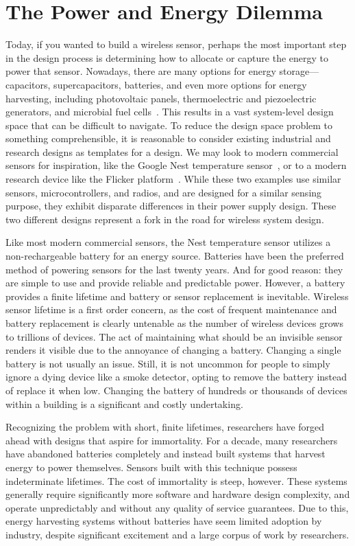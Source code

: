 \section{The Power and Energy Dilemma}
Today, if you wanted to build a wireless sensor, perhaps the most important step in the design process is determining how to allocate or capture the energy to power that sensor. 
Nowadays, there are many options for energy storage--- capacitors, supercapacitors, batteries, and even more options for energy harvesting, including photovoltaic panels, thermoelectric and piezoelectric generators, and microbial fuel cells~\cite{yervaGrafting12,campbellThermes14,campbell2018energy,josephson2020farming}.
This results in a vast system-level design space that can be difficult to navigate.
To reduce the design space problem to something comprehensible, it is reasonable to consider existing industrial and research designs as templates for a design.
We may look to modern commercial sensors for inspiration, like the Google Nest temperature sensor~\cite{googleNestTemperature}, or to a modern research device like the Flicker platform~\cite{hesterFlicker17}.
While these two examples use similar sensors, microcontrollers, and radios, and are designed for a similar sensing purpose, they exhibit disparate differences in their power supply design.
These two different designs represent a fork in the road for wireless system design.

Like most modern commercial sensors, the Nest temperature sensor utilizes a non-rechargeable battery for an energy source. 
Batteries have been the preferred method of powering sensors for the last twenty years. And for good reason: they are simple to use and provide reliable and predictable power.
However, a battery provides a finite lifetime and battery or sensor replacement is inevitable.
Wireless sensor lifetime is a first order concern, as the cost of frequent maintenance and battery replacement is clearly untenable as the number of wireless devices grows to trillions of devices. 
The act of maintaining what should be an invisible sensor renders it visible due to the annoyance of changing a battery.
Changing a single battery is not usually an issue. 
Still, it is not uncommon for people to simply ignore a dying device like a smoke detector, opting to remove the battery instead of replace it when low. 
Changing the battery of hundreds or thousands of devices within a building is a significant and costly undertaking.

Recognizing the problem with short, finite lifetimes, researchers have forged ahead with designs that aspire for immortality.
For a decade, many researchers have abandoned batteries completely and instead built systems that harvest energy to power themselves. 
Sensors built with this technique possess indeterminate lifetimes. The cost of immortality is steep, however.
These systems generally require significantly more software and hardware design complexity, and operate unpredictably and without any quality of service guarantees.
Due to this, energy harvesting systems without batteries have seem limited adoption by industry, despite significant excitement and a large corpus of work by researchers. 

